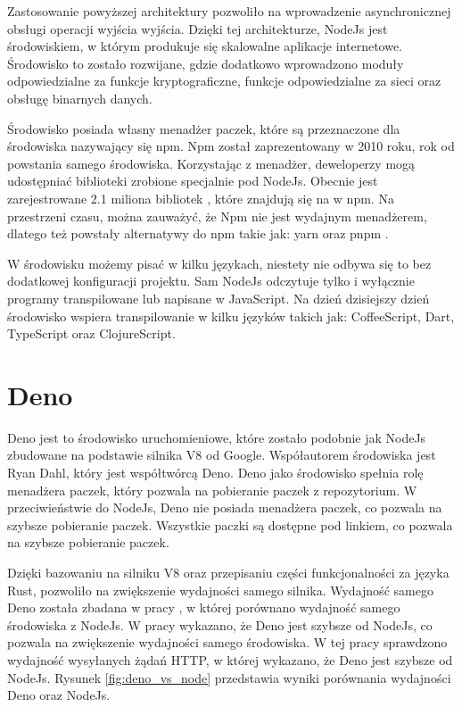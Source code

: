 Zastosowanie powyższej architektury pozwoliło na wprowadzenie asynchronicznej obsługi operacji wyjścia wyjścia. Dzięki tej architekturze, NodeJs jest środowiskiem, w którym produkuje się skalowalne aplikacje internetowe. Środowisko to zostało rozwijane, gdzie dodatkowo wprowadzono moduły odpowiedzialne za funkcje kryptograficzne, funkcje odpowiedzialne za sieci oraz obsługę binarnych danych.

Środowisko posiada własny menadżer paczek, które są przeznaczone dla środowiska nazywający się npm. Npm został zaprezentowany w 2010 roku, rok od powstania samego środowiska. Korzystając z menadżer, deweloperzy mogą udostępniać biblioteki zrobione specjalnie pod NodeJs. Obecnie jest zarejestrowane 2.1 miliona bibliotek \cite{npm}, które znajdują się na w npm. Na przestrzeni czasu, można zauważyć, że Npm nie jest wydajnym menadżerem, dlatego też powstały alternatywy do npm takie jak: yarn \cite{yarn} oraz pnpm \cite{pnpm}. 

W środowisku możemy pisać w kilku językach, niestety nie odbywa się to bez dodatkowej konfiguracji projektu. Sam NodeJs odczytuje tylko i wyłącznie programy transpilowane lub napisane w JavaScript. Na dzień dzisiejszy dzień środowisko wspiera transpilowanie w kilku języków takich jak: CoffeeScript, Dart, TypeScript oraz ClojureScript.

\section*{Deno}
Deno jest to środowisko uruchomieniowe, które zostało podobnie jak NodeJs zbudowane na podstawie silnika V8 od Google. Współautorem środowiska jest Ryan Dahl, który jest współtwórcą Deno. Deno jako środowisko spełnia rolę menadżera paczek, który pozwala na pobieranie paczek z repozytorium. W przeciwieństwie do NodeJs, Deno nie posiada menadżera paczek, co pozwala na szybsze pobieranie paczek. Wszystkie paczki są dostępne pod linkiem, co pozwala na szybsze pobieranie paczek.

Dzięki bazowaniu na silniku V8 oraz przepisaniu części funkcjonalności za języka Rust, pozwoliło na zwiększenie wydajności samego silnika. Wydajność samego Deno została zbadana w pracy \cite{deno_performance}, w której porównano wydajność samego środowiska z NodeJs. W pracy wykazano, że Deno jest szybsze od NodeJs, co pozwala na zwiększenie wydajności samego środowiska. W tej pracy sprawdzono wydajność wysyłanych żądań HTTP, w której wykazano, że Deno jest szybsze od NodeJs. Rysunek \ref{fig:deno_vs_node} przedstawia wyniki porównania wydajności Deno oraz NodeJs.

